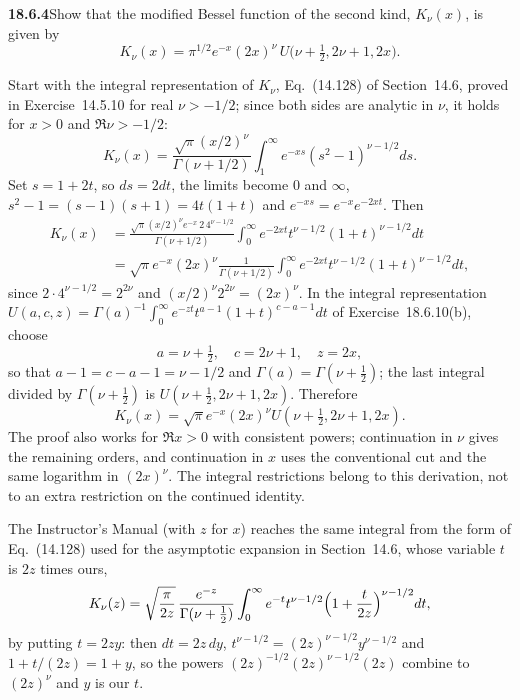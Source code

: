 \par\bigskip
\noindent\textbf{18.6.4}\quad Show that the modified Bessel function
of the second kind, $K_{\nu}(x)$, is given by
\[
K_{\nu}(x)=\pi^{1/2}e^{-x}(2x)^{\nu}\,
U\big(\nu+\tfrac{1}{2},2\nu+1,2x\big).
\]
\par\nobreak
\solution
Start with the integral representation of $K_\nu$, Eq.~(14.128) of
Section~14.6, proved in Exercise~14.5.10 for real $\nu>-1/2$; since
both sides are analytic in $\nu$, it holds for $x>0$ and
$\Re\nu>-1/2$:
\[
K_\nu(x)=\frac{\sqrt\pi(x/2)^\nu}{\Gamma(\nu+1/2)}
 \int_1^\infty e^{-xs}(s^2-1)^{\nu-1/2}ds.
\]
Set $s=1+2t$, so $ds=2dt$, the limits become $0$ and $\infty$,
$s^2-1=(s-1)(s+1)=4t(1+t)$ and $e^{-xs}=e^{-x}e^{-2xt}$.  Then
\begin{align*}
K_\nu(x)
 &=\frac{\sqrt\pi(x/2)^\nu e^{-x}\,2\,4^{\nu-1/2}}
         {\Gamma(\nu+1/2)}
   \int_0^\infty e^{-2xt}t^{\nu-1/2}(1+t)^{\nu-1/2}dt\\
 &=\sqrt\pi e^{-x}(2x)^\nu
   \frac1{\Gamma(\nu+1/2)}
   \int_0^\infty e^{-2xt}t^{\nu-1/2}(1+t)^{\nu-1/2}dt,
\end{align*}
since $2\cdot4^{\nu-1/2}=2^{2\nu}$ and $(x/2)^\nu2^{2\nu}=(2x)^\nu$.
In the integral representation
$U(a,c,z)=\Gamma(a)^{-1}\int_0^\infty e^{-zt}t^{a-1}(1+t)^{c-a-1}dt$
of Exercise~18.6.10(b), choose
\[
a=\nu+\tfrac12,\quad c=2\nu+1,\quad z=2x,
\]
so that $a-1=c-a-1=\nu-1/2$ and $\Gamma(a)=\Gamma(\nu+\frac12)$;
the last integral divided by $\Gamma(\nu+\frac12)$ is
$U(\nu+\frac12,2\nu+1,2x)$.  Therefore
\[
\boxed{K_\nu(x)=\sqrt\pi e^{-x}(2x)^\nu
               U(\nu+\tfrac12,2\nu+1,2x)}.
\]
The proof also works for $\Re x>0$ with consistent powers;
continuation in $\nu$ gives the remaining orders, and continuation
in $x$ uses the conventional cut and the same logarithm in $(2x)^\nu$.
The integral restrictions belong to this derivation, not to an
extra restriction on the continued identity.

The Instructor's Manual (with $z$ for $x$) reaches the same
integral from the form of Eq.~(14.128) used for the asymptotic
expansion in Section~14.6, whose variable $t$ is $2z$ times ours,
\[
K_\nu(z)=\sqrt{\frac{\pi}{2z}}\,\frac{e^{-z}}{\Gamma(\nu+\frac12)}
 \int_0^\infty e^{-t}t^{\nu-1/2}\Bigl(1+\frac{t}{2z}\Bigr)^{\nu-1/2}dt,
\]
by putting $t=2zy$: then $dt=2z\,dy$,
$t^{\nu-1/2}=(2z)^{\nu-1/2}y^{\nu-1/2}$ and $1+t/(2z)=1+y$, so the
powers $(2z)^{-1/2}(2z)^{\nu-1/2}(2z)$ combine to $(2z)^\nu$ and
$y$ is our $t$.

